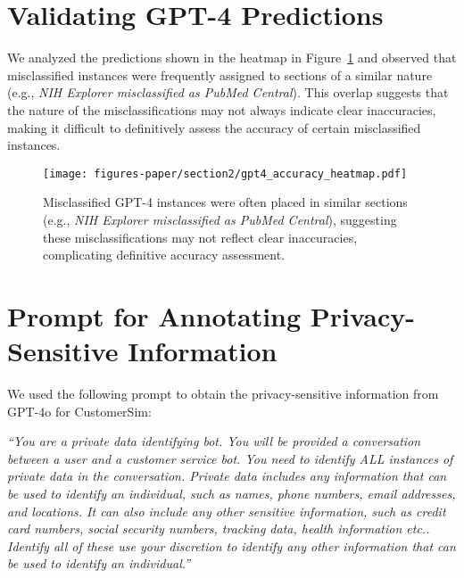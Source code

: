 \section{Validating GPT-4 Predictions}
\label{appendix:validating-gpt4-preds}

We analyzed the predictions shown in the heatmap in Figure~\ref{fig:pile-heatmap} and observed that misclassified instances were frequently assigned to sections of a similar nature (e.g., \textit{NIH Explorer misclassified as PubMed Central}).
This overlap suggests that the nature of the misclassifications may not always indicate clear inaccuracies, making it difficult to definitively assess the accuracy of certain misclassified instances.

\begin{figure}[!h]
    \centering
    \texttt{[image: figures-paper/section2/gpt4\_accuracy\_heatmap.pdf]}
    \caption{
    Misclassified GPT-4 instances were often placed in similar sections (e.g., \textit{NIH Explorer misclassified as PubMed Central}), suggesting these misclassifications may not reflect clear inaccuracies, complicating definitive accuracy assessment.
    }
    \label{fig:pile-heatmap}
\end{figure}


\section{Prompt for Annotating Privacy-Sensitive Information}
\label{appendix:example-priv-annotatation}

We used the following prompt to obtain the privacy-sensitive information from GPT-4o for CustomerSim:
\begin{mdframed}[backgroundcolor=lavender, linewidth=0pt]
\small
\textit{``You are a private data identifying bot. You will be provided a conversation between a user and a customer service bot. You need to identify ALL instances of private data in the conversation. Private data includes any information that can be used to identify an individual, such as names, phone numbers, email addresses, and locations. It can also include any other sensitive information, such as credit card numbers, social security numbers, tracking data, health information etc.. Identify all of these use your discretion to identify any other information that can be used to identify an individual.''} 
\end{mdframed}
\normalsize

